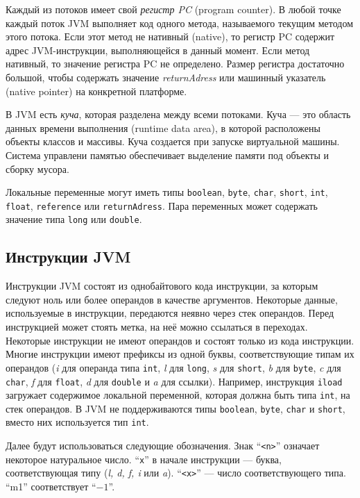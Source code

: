 Каждый из потоков имеет свой \emph{регистр PC} (program counter). В любой точке каждый поток JVM выполняет код одного метода, 
называемого текущим методом этого потока. Если этот метод не нативный (native), то регистр PC содержит адрес JVM-инструкции, 
выполняющейся в данный момент. Если метод нативный, то значение регистра PC не определено. Размер регистра достаточно большой, 
чтобы содержать значение \emph{returnAdress} или машинный указатель (native pointer) на конкретной платформе.

В JVM есть \emph{куча}, которая разделена между всеми потоками. Куча --- это область данных времени выполнения 
(runtime data area), в которой расположены объекты классов и массивы. Куча создается при запуске виртуальной машины. 
Система управлени памятью обеспечивает выделение памяти под объекты и сборку мусора.

Локальные переменные могут иметь типы \texttt{boolean}, \texttt{byte}, \texttt{char}, \texttt{short}, \texttt{int}, \texttt{float}, 
\texttt{reference} или \texttt{returnAdress}. Пара переменных может содержать значение типа \texttt{long} или \texttt{double}.

\subsection{Инструкции JVM}

Инструкции JVM состоят из однобайтового кода инструкции, за которым следуют ноль или более операндов в качестве аргументов. 
Некоторые данные, используемые в инструкции, передаются неявно через стек операндов. Перед инструкцией может стоять метка, на неё 
можно ссылаться в переходах. Некоторые инструкции не имеют операндов и состоят только из кода инструкции. Многие инструкции имеют
префиксы из одной буквы, соответствующие типам их операндов ({\it i} для операнда типа \texttt{int}, {\it l} для \texttt{long}, 
{\it s} для \texttt{short}, {\it b} для \texttt{byte}, {\it c} для \texttt{char}, {\it f} для \texttt{float}, {\it d} для \texttt{double} 
и {\it a} для ссылки). Например, инструкция \texttt{iload} загружает содержимое локальной переменной, которая должна быть типа 
\texttt{int}, на стек операндов. В JVM не поддерживаются типы \texttt{boolean}, \texttt{byte}, \texttt{char} и \texttt{short}, 
вместо них используется тип \texttt{int}. 

Далее будут использоваться следующие обозначения. Знак ``\texttt{<n>}'' означает некоторое натуральное число. ``\texttt{x}'' в начале инструкции --- буква, 
соответствующая типу (\textit{l, d, f, i} или \textit{a}). ``\texttt{<x>}'' --- число соответствующего типа. ``m1'' соответствует ``$-1$''.

